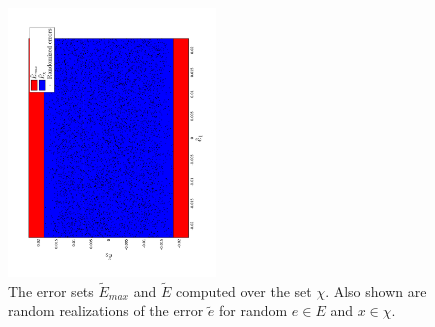 \begin{figure}
\includegraphics[angle=270,width=0.49\textwidth]{figs/Err_Bounds_toy.pdf}
\caption{The error sets $\tilde{E}_{max}$ and $\tilde{E}$ computed over the set $\chi$. Also shown are random realizations of the error $\tilde{e}$ for random $e \in E$ and $x \in \chi$.}
\label{fig:err_bound_toy}
\end{figure}

